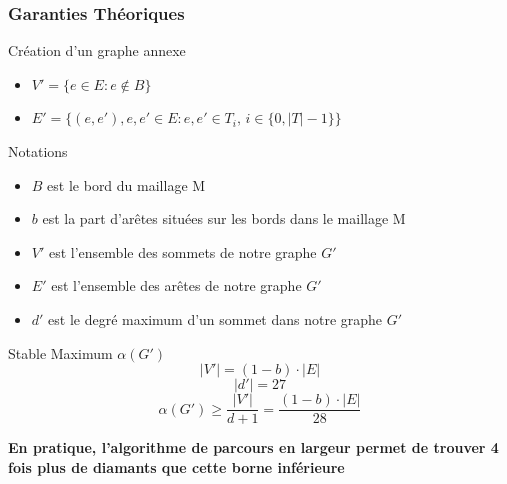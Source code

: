 \documentclass[9pt]{beamer}
\begin{document}
\begin{frame}[noframenumbering]
\small
\frametitle{Garanties Théoriques}
\begin{block}{Création d'un graphe annexe}
\begin{itemize}
\item $V' = \{e\in E : e\notin B\}$
\item $E'=\{(e,e'), e,e'\in E : e,e' \in T_i, \,  i\in \{0,|T|-1\}\}$ 
\end{itemize}
\end{block}
\begin{block}{Notations}
\begin{itemize}
\item $B$ est le bord du maillage M
\item $b$ est la part d'arêtes situées sur les bords dans le maillage M
\item $V'$ est l'ensemble des sommets de notre graphe $G'$
\item $E'$ est l'ensemble des arêtes de notre graphe $G'$
\item $d'$ est le degré maximum d'un sommet dans notre graphe $G'$
\end{itemize}
\end{block}

\begin{block}{Stable Maximum $\alpha(G')$}
\begin{equation}
|V'|=(1-b)\cdot |E|
\end{equation}
\begin{equation}
|d'|= 27
\end{equation}
\begin{equation}
\alpha(G')\geqslant \frac{|V'|}{d+1} = \frac{(1-b)\cdot |E|}{28}
\end{equation}
\end{block}
\textbf{En pratique, l'algorithme de parcours en largeur permet de trouver 4 fois plus de diamants que cette borne inférieure}
\end{frame}
\end{document}
